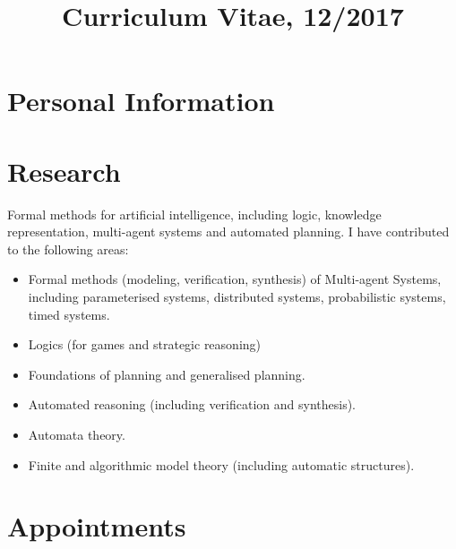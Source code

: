 \documentclass[10pt,a4paper,sans]{moderncv}
\title{Curriculum Vitae, 12/2017}                               %
\begin{document}
\makecvtitle


\section{Personal Information}


\section{Research}
Formal methods for artificial intelligence, including logic, knowledge representation, multi-agent systems and automated planning. %
I have contributed to the following areas:
\begin{itemize}
 \item Formal methods (modeling, verification, synthesis) of Multi-agent Systems, including parameterised systems, distributed systems, probabilistic systems, timed systems.
 \item Logics (for games and strategic reasoning)
 \item Foundations of planning and generalised planning.
 \item Automated reasoning (including verification and synthesis).
 \item Automata theory.
 \item Finite and algorithmic model theory (including automatic structures).
\end{itemize}

\section{Appointments}
\end{document}

